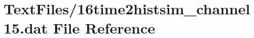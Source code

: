 \hypertarget{16time2histsim__channel15_8dat}{}\section{Text\+Files/16time2histsim\+\_\+channel15.dat File Reference}
\label{16time2histsim__channel15_8dat}
